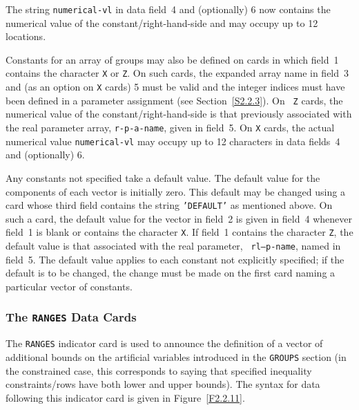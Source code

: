\documentclass[a4paper]{article}
\begin{document}
The string  {\tt numerical-vl} in data  field~4 and  (optionally) 6
now  contains the numerical value  of the constant/right-hand-side and
may occupy up to 12 locations.

Constants for an array
of groups may also be defined on cards
in which field~1 contains the character {\tt X} or {\tt Z}.
On such cards, the expanded array name
in field~3 and (as an option on
{\tt X} cards) 5 must be valid and the integer  indices must have been
defined in a parameter assignment (see Section~\ref{S2.2.3}).  On {\tt
Z} cards, the numerical  value of the constant/right-hand-side is that
previously associated with the real parameter array,
{\tt r-p-a-name},
given in field~5.   On {\tt X} cards,
the actual numerical value  {\tt  numerical-vl}  may  occupy up  to 12
characters in data fields~4 and (optionally) 6.

Any constants not  specified  take a default  value. The default value
for the components of each vector is  initially zero.
This default may
be changed using  a card
whose third field  contains  the  string {\tt 'DEFAULT'}
as mentioned above.  On such a card,  the default value for
the vector in field~2 is given in field~4 whenever field~1 is blank
or contains the character {\tt X}.
If field~1 contains the character  {\tt Z},
the default  value  is that associated  with the real  parameter,
{\tt
rl--p-name}, named in   field~5.  The default value  applies   to each
constant  not explicitly  specified; if the  default is to be changed,
the change must be made on the first card
naming a  particular vector of constants.

\subsubsection{\label{S2.2.11}The {\tt RANGES} Data Cards}

The {\tt RANGES} indicator card
is used to announce the definition of a vector of additional bounds
on  the artificial variables introduced
in the {\tt GROUPS}
section (in the constrained case, this corresponds
to saying that  specified inequality  constraints/rows
have both lower and upper bounds).  The syntax for data following this
indicator card
is given in Figure~\ref{F2.2.11}.
\end{document}
